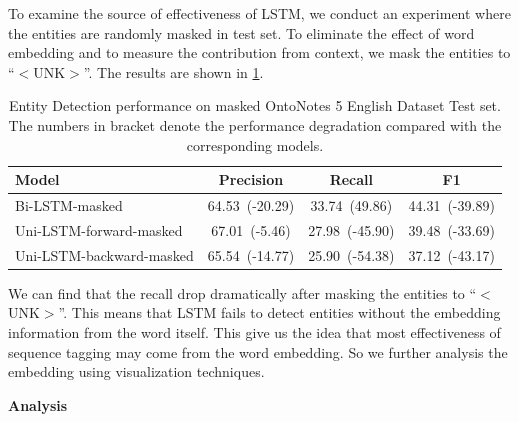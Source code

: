 \documentclass{article}
\begin{document}
To examine the source of effectiveness of LSTM, we conduct an experiment where the entities are randomly masked in test set. To eliminate the effect of word embedding and to measure the contribution from context, we mask the entities to ``$<$UNK$>$''. The results are shown in \ref{tab:mask}.


\begin{table}[t]
	\centering
	\begin{tabular}{l@{\qquad}ccc}
		\toprule
		\textbf{Model}		& \textbf{Precision}	& \textbf{Recall}	& \textbf{F1} \\ \midrule
		Bi-LSTM-masked 	& 64.53~(-20.29) 			& 33.74~(49.86)			& 44.31~(-39.89) \\ 
		Uni-LSTM-forward-masked & 67.01~(-5.46) 		& 27.98~(-45.90) 			& 39.48~(-33.69) \\ 
		Uni-LSTM-backward-masked& 65.54~(-14.77) 		& 25.90~(-54.38)			& 37.12~(-43.17) \\ 
		\bottomrule
	\end{tabular}
	\vspace{3mm}
	\caption{Entity Detection performance on masked OntoNotes 5 English Dataset Test set. The numbers in bracket denote the performance degradation compared with the corresponding models.}
	\label{tab:mask}
\end{table}

We can find that the recall drop dramatically after masking the entities to ``$<$UNK$>$''. This means that LSTM fails to detect entities without the embedding information from the word itself. This give us the idea that most effectiveness of sequence tagging may come from the word embedding. So we further analysis the embedding using visualization techniques.

\noindent \textbf{Analysis}
\end{document}
